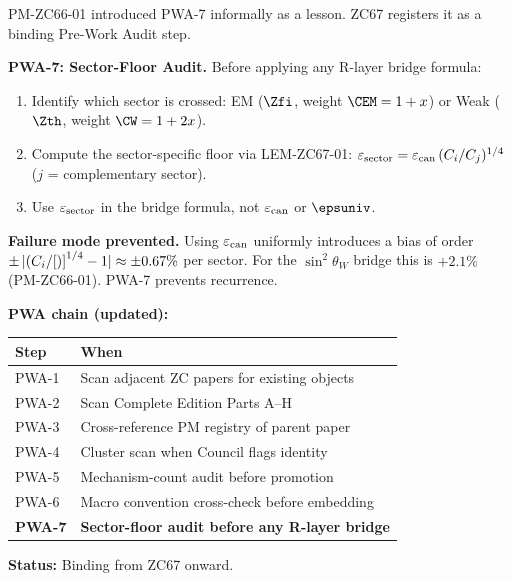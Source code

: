 \documentclass[12pt, a4paper]{article}
\renewcommand{\epscan}{\varepsilon_{\rm can}}
\renewcommand{\swsq}{\sin^2\!\theta_W}
\begin{document}
\begin{derivedbox}[title={FIND-ZC67-01: PWA-7 --- Sector-Floor Audit
  Protocol (Formal Registration)}]

PM-ZC66-01 introduced PWA-7 informally as a lesson.
ZC67 registers it as a binding Pre-Work Audit step.

\textbf{PWA-7: Sector-Floor Audit.}
Before applying any R-layer bridge formula:
\begin{enumerate}[leftmargin=2em, noitemsep]
  \item Identify which sector is crossed:
    EM ($\Zfi$, weight $\CEM = 1+x$)
    or Weak ($\Zth$, weight $\CW = 1+2x$).
  \item Compute the sector-specific floor via LEM-ZC67-01:
    $\varepsilon_{\rm sector} = \epscan\,(C_i/C_j)^{1/4}$ ($j$ = complementary sector).
  \item Use $\varepsilon_{\rm sector}$ in the bridge formula,
    not $\epscan$ or $\epsuniv$.
\end{enumerate}

\textbf{Failure mode prevented.}
Using $\epscan$ uniformly introduces a bias of
order $\pm\,|{(C_i/\Cref)^{1/4} - 1}| \approx \pm 0.67\%$
per sector.
For the $\swsq$ bridge this is $+2.1\%$ (PM-ZC66-01).
PWA-7 prevents recurrence.

\textbf{PWA chain (updated):}
\begin{center}
{\small\renewcommand{\arraystretch}{1.25}
\begin{tabular}{@{}ll@{}}
\toprule
Step & When \\
\midrule
PWA-1 & Scan adjacent ZC papers for existing objects \\
PWA-2 & Scan Complete Edition Parts A--H \\
PWA-3 & Cross-reference PM registry of parent paper \\
PWA-4 & Cluster scan when Council flags identity \\
PWA-5 & Mechanism-count audit before promotion \\
PWA-6 & Macro convention cross-check before embedding \\
\textbf{PWA-7} & \textbf{Sector-floor audit before any R-layer bridge} \\
\bottomrule
\end{tabular}
}
\end{center}
\textbf{Status:} Binding from ZC67 onward.
\end{derivedbox}

\end{document}
